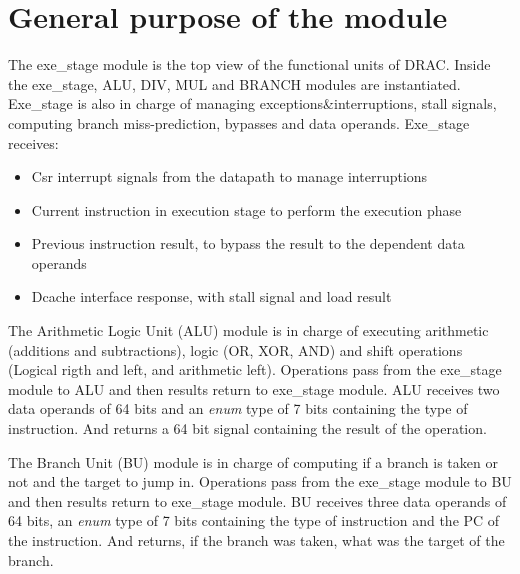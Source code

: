 \newpage
\section{General purpose of the module}

The exe\_stage module is the top view of the functional units of DRAC. Inside the exe\_stage, ALU, DIV, MUL and BRANCH modules are instantiated. Exe\_stage is also in charge of managing exceptions\&interruptions, stall signals, computing branch miss-prediction, bypasses and data operands. Exe\_stage receives:

\begin{itemize}
  \item Csr interrupt signals from the datapath to manage interruptions
  \item Current instruction in execution stage to perform the execution phase
  \item Previous instruction result, to bypass the result to the dependent data operands
  \item Dcache interface response, with stall signal and load result
\end{itemize}

The Arithmetic Logic Unit (ALU) module is in charge of executing arithmetic (additions and subtractions), logic (OR, XOR, AND) and shift operations (Logical rigth and left, and arithmetic left). Operations pass from the exe\_stage module to ALU and then results return to exe\_stage module. ALU receives two data operands of 64 bits and an \emph{enum} type of 7 bits containing the type of instruction. And returns a 64 bit signal containing the result of the operation.

The Branch Unit (BU) module is in charge of computing if a branch is taken or not and the target to jump in. Operations pass from the exe\_stage module to BU and then results return to exe\_stage module. BU receives three data operands of 64 bits, an \emph{enum} type of 7 bits containing the type of instruction and the PC of the instruction. And returns, if the branch was taken, what was the target of the branch.